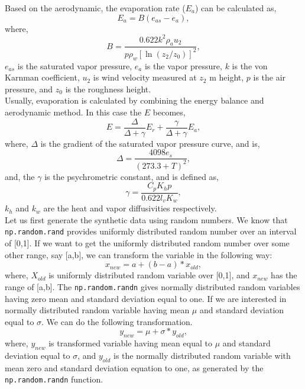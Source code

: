 \documentclass[10pt]{book}
\begin{document}
{Based on the aerodynamic, the evaporation rate ($E_a$) can be calculated as,
\begin{equation}
E_a = B\left(e_{as} - e_a\right),
\end{equation}
where,
\begin{equation}
B = \frac{0.622k^2 \rho_a u_2}{p \rho_w \left[\ln (z_2/z_0)\right]^2},
\end{equation}
$e_{as}$ is the saturated vapor pressure, $e_a$ is the vapor pressure, $k$ is the von Karnman coefficient, $u_2$ is wind velocity measured at $z_2$ m height, $p$ is the air pressure, and $z_0$ is the roughness height. \\

Usually, evaporation is calculated by combining the energy balance and aerodynamic method. In this case the $E$ becomes,
\begin{equation}
E = \frac{\Delta}{\Delta + \gamma} E_r + \frac{\gamma}{\Delta + \gamma}E_a,
\end{equation}
where, $\Delta$ is the gradient of the saturated vapor pressure curve, and is,
\begin{equation}
\Delta = \frac{4098 e_s}{(273.3+T)^2},
\end{equation}
and, the $\gamma$ is the psychrometric constant, and is defined as,
\begin{equation}
\gamma = \frac{C_p K_h p}{0.622 l_v K_w},
\end{equation}
$k_h$ and $k_w$ are the heat and vapor diffusivities respectively. \\

Let us first generate the synthetic data using random numbers. We know that \verb"np.random.rand" provides uniformly distributed random number over an interval of [0,1]. If we want to get the uniformly distributed random number over some other range, say [a,b], we can transform the variable in the following way:
\begin{equation}
x_{new} = a + (b-a)*x_{old},
\end{equation}
where, $X_{old}$ is uniformly distributed random variable over [0,1], and $x_{new}$ has the range of [a,b]. The \verb"np.random.randn" gives normally distributed random variables having zero mean and standard deviation equal to one. If we are interested in normally distributed random variable having mean $\mu$ and standard deviation equal to $\sigma$. We can do the following transformation.
\begin{equation}
y_{new} = \mu + \sigma*y_{old},
\end{equation}
where, $y_{new}$ is transformed variable having mean equal to $\mu$ and standard deviation equal to $\sigma$, and $y_{old}$ is the normally distributed random variable with mean zero and standard deviation equation to one, as generated by the \verb"np.random.randn" function. \\

}
\end{document}
